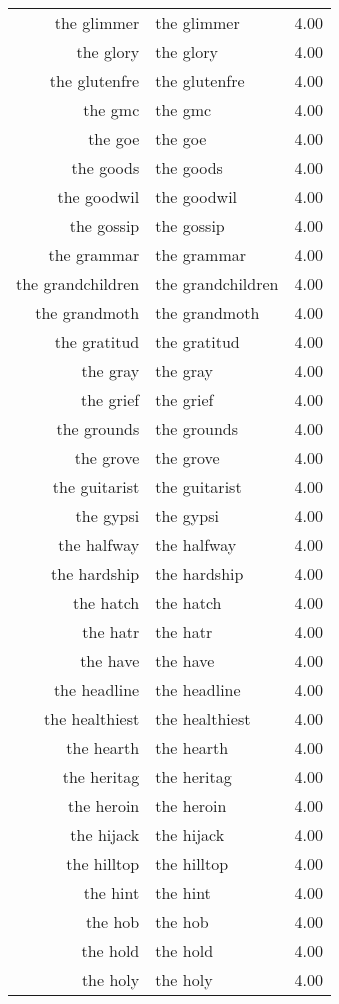 \begin{table}[ht]
\begin{tabular}{rlr}
  the glimmer & the glimmer & 4.00 \\ 
  the glory & the glory & 4.00 \\ 
  the glutenfre & the glutenfre & 4.00 \\ 
  the gmc & the gmc & 4.00 \\ 
  the goe & the goe & 4.00 \\ 
  the goods & the goods & 4.00 \\ 
  the goodwil & the goodwil & 4.00 \\ 
  the gossip & the gossip & 4.00 \\ 
  the grammar & the grammar & 4.00 \\ 
  the grandchildren & the grandchildren & 4.00 \\ 
  the grandmoth & the grandmoth & 4.00 \\ 
  the gratitud & the gratitud & 4.00 \\ 
  the gray & the gray & 4.00 \\ 
  the grief & the grief & 4.00 \\ 
  the grounds & the grounds & 4.00 \\ 
  the grove & the grove & 4.00 \\ 
  the guitarist & the guitarist & 4.00 \\ 
  the gypsi & the gypsi & 4.00 \\ 
  the halfway & the halfway & 4.00 \\ 
  the hardship & the hardship & 4.00 \\ 
  the hatch & the hatch & 4.00 \\ 
  the hatr & the hatr & 4.00 \\ 
  the have & the have & 4.00 \\ 
  the headline & the headline & 4.00 \\ 
  the healthiest & the healthiest & 4.00 \\ 
  the hearth & the hearth & 4.00 \\ 
  the heritag & the heritag & 4.00 \\ 
  the heroin & the heroin & 4.00 \\ 
  the hijack & the hijack & 4.00 \\ 
  the hilltop & the hilltop & 4.00 \\ 
  the hint & the hint & 4.00 \\ 
  the hob & the hob & 4.00 \\ 
  the hold & the hold & 4.00 \\ 
  the holy & the holy & 4.00 \\ 

\end{tabular}
\end{table}
